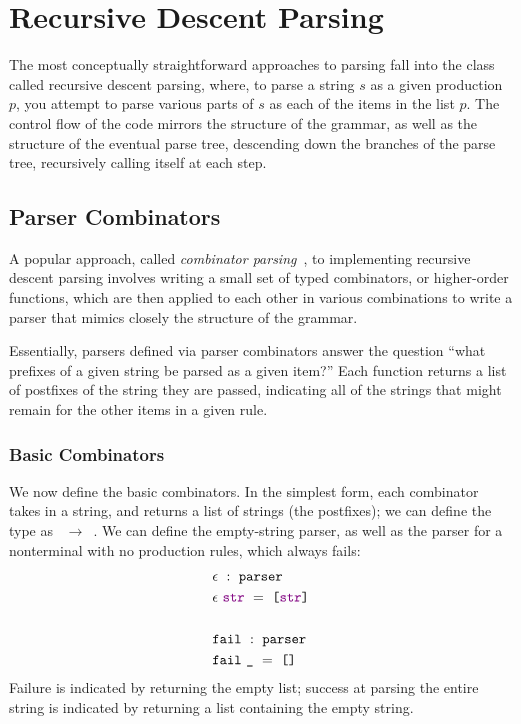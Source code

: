   
  \section{Recursive Descent Parsing}
    The most conceptually straightforward approaches to parsing fall into the class called recursive descent parsing, where, to parse a string $s$ as a given production $p$, you attempt to parse various parts of $s$ as each of the items in the list $p$.  The control flow of the code mirrors the structure of the grammar, as well as the structure of the eventual parse tree, descending down the branches of the parse tree, recursively calling itself at each step.
    
    \subsection{Parser Combinators}
      A popular approach, called \emph{combinator parsing}~\cite{pcomb}, to implementing recursive descent parsing involves writing a small set of typed combinators, or higher-order functions, which are then applied to each other in various combinations to write a parser that mimics closely the structure of the grammar.
      
      Essentially, parsers defined via parser combinators answer the question ``what prefixes of a given string be parsed as a given item?''  Each function returns a list of postfixes of the string they are passed, indicating all of the strings that might remain for the other items in a given rule.  
      
    \subsubsection{Basic Combinators}
      We now define the basic combinators.  In the simplest form, each combinator takes in a string, and returns a list of strings (the postfixes); we can define the type  as ~$\to$~.  We can define the empty-string parser, as well as the parser for a nonterminal with no production rules, which always fails:
\begin{align*}
&\epsilon~:~\texttt{parser}\\
&\epsilon~\textcolor{violet}{\texttt{str}}~=~\texttt{[}\textcolor{violet}{\texttt{str}}\texttt{]} \\ \\
&\texttt{fail}~:~\texttt{parser}\\
&\texttt{fail}~\texttt{\_}~=~\texttt{[]}
\end{align*}
      Failure is indicated by returning the empty list; success at parsing the entire string is indicated by returning a list containing the empty string.
      
